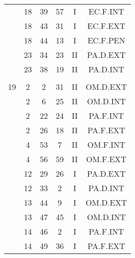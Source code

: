 \documentclass[12pt, a4paper]{article}
\begin{document}
\begin{multicols}{3}
{\begin{tabular}{c c c c c c}
	 	 	 	 & 18 & 39 & 57 & I & EC.F.INT\\%
	 	 	 	 & 18 & 43 & 31 & I & EC.F.EXT\\%
	 	 	 	 & 18 & 44 & 13 & I & EC.F.PEN\\%
	 	 	 	 & 23 & 34 & 23 & II & PA.D.EXT\\%
	 	 	 	 & 23 & 38 & 19 & II & PA.D.INT\\%
	 	 	 	 & & & & & \\%
	 	 	 	19 & 2 & 2 & 31 & II & OM.D.EXT\\%
	 	 	 	 & 2 & 6 & 25 & II & OM.D.INT\\%
	 	 	 	 & 2 & 22 & 24 & II & PA.F.INT\\%
	 	 	 	 & 2 & 26 & 18 & II & PA.F.EXT\\%
	 	 	 	 & 4 & 53 & 7 & II & OM.F.INT\\%
	 	 	 	 & 4 & 56 & 59 & II & OM.F.EXT\\%
	 	 	 	 & 12 & 29 & 26 & I & PA.D.EXT\\%
	 	 	 	 & 12 & 33 & 2 & I & PA.D.INT\\%
	 	 	 	 & 13 & 44 & 9 & I & OM.D.EXT\\%
	 	 	 	 & 13 & 47 & 45 & I & OM.D.INT\\%
	 	 	 	 & 14 & 46 & 2 & I & PA.F.INT\\%
	 	 	 	 & 14 & 49 & 36 & I & PA.F.EXT\\%
	 	 \end{tabular}
 	}
\end{multicols}
\end{document}
